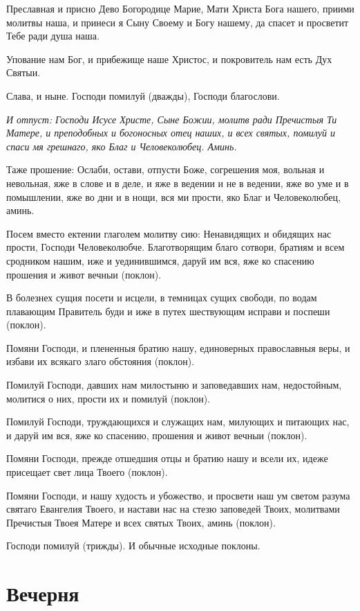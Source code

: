 Преславная и присно Дево Богородице Марие, Мати Христа Бога нашего, приими молитвы наша, и принеси я Сыну Своему и Богу нашему, да спасет и просветит Тебе ради душа наша.

Упование нам Бог, и прибежище наше Христос, и покровитель нам есть Дух Святыи.

Слава, и ныне. Господи помилуй (дважды), Господи благослови.


\itshape И отпуст:\normalfont{} Господи Исусе Христе, Сыне Божии, молитв ради Пречистыя Ти Матере, и преподобных и богоносных отец наших, и всех святых, помилуй и спаси мя грешнаго, яко Благ и Человеколюбец. Аминь. 

Таже прошение: Ослаби, остави, отпусти Боже, согрешения моя, вольная и невольная, яже в слове и в деле, и яже в ведении и не в ведении, яже во уме и в помышлении, яже во дни и в нощи, вся ми прости, яко Благ и Человеколюбец, аминь.

Посем вместо ектении глаголем молитву сию: Ненавидящих и обидящих нас прости, Господи Человеколюбче. Благотворящим благо сотвори, братиям и всем сродником нашим, иже и уединившимся, даруй им вся, яже ко спасению прошения и живот вечныи (поклон).

В болезнех сущия посети и исцели, в темницах сущих свободи, по водам плавающим Правитель буди и иже в путех шествующим исправи и поспеши (поклон).

Помяни Господи, и плененныя братию нашу, единоверных православныя веры, и избави их всякаго злаго обстояния (поклон).

Помилуй Господи, давших нам милостыню и заповедавших нам, недостойным, молитися о них, прости их и помилуй (поклон).

Помилуй Господи, труждающихся и служащих нам, милующих и питающих нас, и даруй им вся, яже ко спасению, прошения и живот вечныи (поклон).

Помяни Господи, прежде отшедшия отцы и братию нашу и всели их, идеже присещает свет лица Твоего (поклон).

Помяни Господи, и нашу худость и убожество, и просвети наш ум светом разума святаго Евангелия Твоего, и настави нас на стезю заповедей Твоих, молитвами Пречистыя Твоея Матере и всех святых Твоих, аминь (поклон).

Господи помилуй (трижды). И обычные исходные поклоны.


\section{Вечерня}
 


